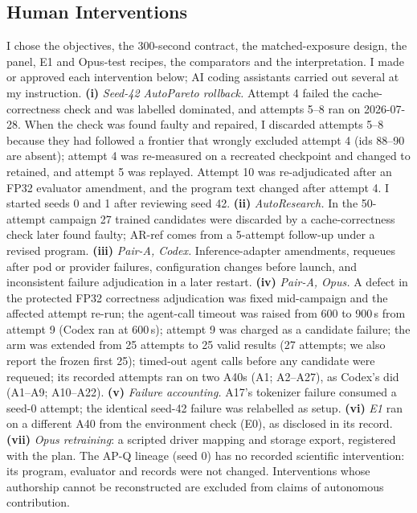 \documentclass{article}
\begin{document}
\subsection{Human Interventions}\label{sec:interventions}
I chose the objectives, the 300-second contract, the matched-exposure design, the panel, E1 and Opus-test recipes, the comparators and the interpretation. I made or approved each intervention below; AI coding assistants carried out several at my instruction. \textbf{(i)} \emph{Seed-42 AutoPareto rollback.} Attempt 4 failed the cache-correctness check and was labelled dominated, and attempts 5--8 ran on 2026-07-28. When the check was found faulty and repaired, I discarded attempts 5--8 because they had followed a frontier that wrongly excluded attempt 4 (ids 88--90 are absent); attempt 4 was re-measured on a recreated checkpoint and changed to retained, and attempt 5 was replayed. Attempt 10 was re-adjudicated after an FP32 evaluator amendment, and the program text changed after attempt 4. I started seeds 0 and 1 after reviewing seed 42. \textbf{(ii)} \emph{AutoResearch.} In the 50-attempt campaign 27 trained candidates were discarded by a cache-correctness check later found faulty; AR-ref comes from a 5-attempt follow-up under a revised program. \textbf{(iii)} \emph{Pair-A, Codex.} Inference-adapter amendments, requeues after pod or provider failures, configuration changes before launch, and inconsistent failure adjudication in a later restart. \textbf{(iv)} \emph{Pair-A, Opus.} A defect in the protected FP32 correctness adjudication was fixed mid-campaign and the affected attempt re-run; the agent-call timeout was raised from 600 to 900\,s from attempt 9 (Codex ran at 600\,s); attempt 9 was charged as a candidate failure; the arm was extended from 25 attempts to 25 valid results (27 attempts; we also report the frozen first 25); timed-out agent calls before any candidate were requeued; its recorded attempts ran on two A40s (A1; A2--A27), as Codex's did (A1--A9; A10--A22). \textbf{(v)} \emph{Failure accounting.} A17's tokenizer failure consumed a seed-0 attempt; the identical seed-42 failure was relabelled as setup. \textbf{(vi)} \emph{E1} ran on a different A40 from the environment check (E0), as disclosed in its record. \textbf{(vii)} \emph{Opus retraining}: a scripted driver mapping and storage export, registered with the plan. The AP-Q lineage (seed 0) has no recorded scientific intervention: its program, evaluator and records were not changed. Interventions whose authorship cannot be reconstructed are excluded from claims of autonomous contribution.
\end{document}
